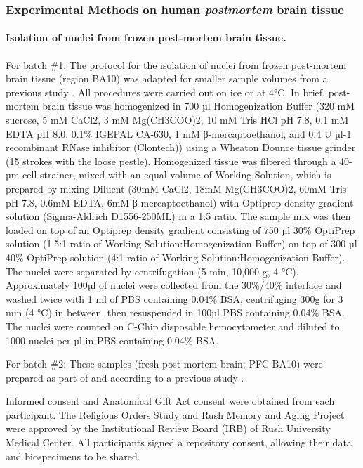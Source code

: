 \subsubsection{\underline{Experimental Methods on human \textit{postmortem} brain tissue}}

\paragraph{Isolation of nuclei from frozen post-mortem brain tissue.}
For batch \#1: The protocol for the isolation of nuclei from frozen post-mortem brain tissue (region BA10) was adapted for smaller sample volumes from a previous study \cite{Mathys2019-wb}. All procedures were carried out on ice or at 4°C. In brief, post-mortem brain tissue was homogenized in 700 µl Homogenization Buffer (320 mM sucrose, 5 mM CaCl2, 3 mM Mg(CH3COO)2, 10 mM Tris HCl pH 7.8, 0.1 mM EDTA pH 8.0, 0.1\% IGEPAL CA-630, 1 mM β-mercaptoethanol, and 0.4 U µl-1 recombinant RNase inhibitor (Clontech)) using a Wheaton Dounce tissue grinder (15 strokes with the loose pestle). Homogenized tissue was filtered through a 40-µm cell strainer, mixed with an equal volume of Working Solution, which is prepared by mixing Diluent (30mM CaCl2, 18mM Mg(CH3COO)2, 60mM Tris pH 7.8, 0.6mM EDTA, 6mM β-mercaptoethanol) with Optiprep density gradient solution (Sigma-Aldrich D1556-250ML) in a 1:5 ratio. The sample mix was then loaded on top of an Optiprep density gradient consisting of 750 µl 30\% OptiPrep solution (1.5:1 ratio of Working Solution:Homogenization Buffer) on top of 300 µl 40\% OptiPrep solution (4:1 ratio of Working Solution:Homogenization Buffer). The nuclei were separated by centrifugation (5 min, 10,000 g, 4 °C). Approximately 100µl of nuclei were collected from the 30\%/40\% interface and washed twice with 1 ml of PBS containing 0.04\% BSA, centrifuging 300g for 3 min (4 °C) in between, then resuspended in 100µl PBS containing 0.04\% BSA. The nuclei were counted on C-Chip disposable hemocytometer and diluted to 1000 nuclei per µl in PBS containing 0.04\% BSA. 

For batch \#2: These samples (fresh post-mortem brain; PFC BA10) were prepared as part of and according to a previous study \cite{Mathys2019-wb}.

Informed consent and Anatomical Gift Act consent were obtained from each participant. The Religious Orders Study and Rush Memory and Aging Project were approved by the Institutional Review Board (IRB) of Rush University Medical Center. All participants signed a repository consent, allowing their data and biospecimens to be shared.

